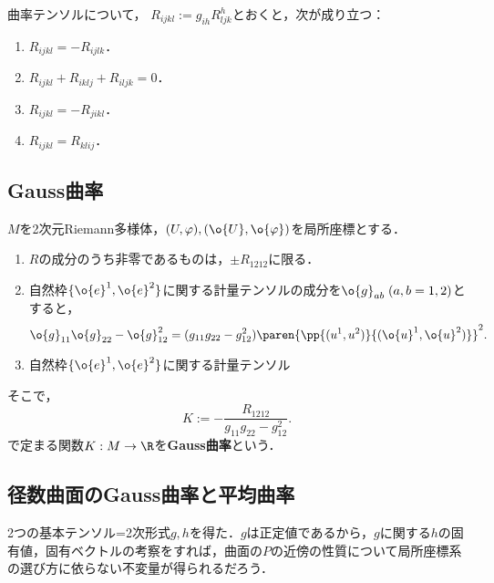 \documentclass[uplatex,dvipdfmx]{jsreport}
\begin{document}
\begin{proposition}
    曲率テンソルについて，
    $R_{ijkl}:=g_{ih}R^h_{ljk}$とおくと，次が成り立つ：
    \begin{enumerate}
        \item $R_{ijkl}=-R_{ijlk}$．
        \item $R_{ijkl}+R_{iklj}+R_{iljk}=0$．
        \item $R_{ijkl}=-R_{jikl}$．
        \item $R_{ijkl}=R_{klij}$．
    \end{enumerate}
\end{proposition}

\subsection{Gauss曲率}

\begin{proposition}
    $M$を2次元Riemann多様体，$(U,\varphi),(\o{U},\o{\varphi})$を局所座標とする．
    \begin{enumerate}
        \item $R$の成分のうち非零であるものは，$\pm R_{1212}$に限る．
        \item 自然枠$\{\o{e}^1,\o{e}^2\}$に関する計量テンソルの成分を$\o{g}_{ab}\;(a,b=1,2)$とすると，
        \[\o{g}_{11}\o{g}_{22}-\o{g}_{12}^2=(g_{11}g_{22}-g_{12}^2)\paren{\pp{(u^1,u^2)}{(\o{u}^1,\o{u}^2)}}^2.\]
        \item 自然枠$\{\o{e}^1,\o{e}^2\}$に関する計量テンソル
    \end{enumerate}
\end{proposition}

\begin{definition}
    そこで，
    \[K:=-\frac{R_{1212}}{g_{11}g_{22}-g_{12}^2}.\]
    で定まる関数$K:M\to\R$を\textbf{Gauss曲率}という．
\end{definition}

\subsection{径数曲面のGauss曲率と平均曲率}

\begin{tcolorbox}[colframe=ForestGreen, colback=ForestGreen!10!white,breakable,colbacktitle=ForestGreen!40!white,coltitle=black,fonttitle=\bfseries\sffamily,
title=]
    2つの基本テンソル=2次形式$g,h$を得た．$g$は正定値であるから，$g$に関する$h$の固有値，固有ベクトルの考察をすれば，曲面の$P$の近傍の性質について局所座標系の選び方に依らない不変量が得られるだろう．
\end{tcolorbox}
\end{document}
